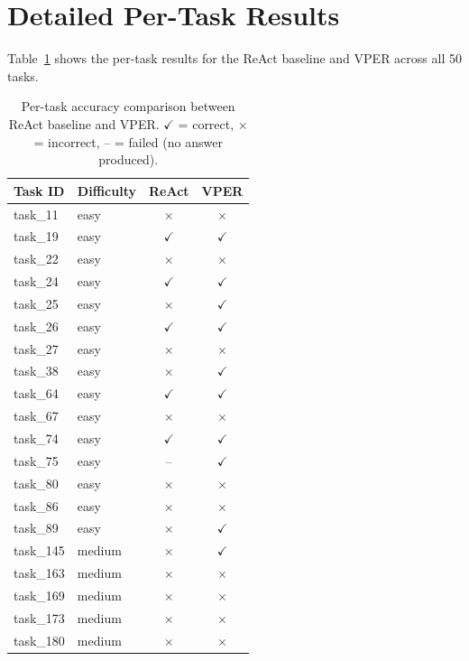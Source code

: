 \appendix

\section{Detailed Per-Task Results}

Table~\ref{tab:per-task} shows the per-task results for the ReAct baseline and VPER across all 50 tasks.

\begin{table}[ht]
\centering
\caption{Per-task accuracy comparison between ReAct baseline and VPER. $\checkmark$ = correct, $\times$ = incorrect, -- = failed (no answer produced).}
\label{tab:per-task}
\scriptsize
\begin{tabular}{llcc}
\toprule
\textbf{Task ID} & \textbf{Difficulty} & \textbf{ReAct} & \textbf{VPER} \\
\midrule
task\_11  & easy    & $\times$ & $\times$ \\
task\_19  & easy    & $\checkmark$ & $\checkmark$ \\
task\_22  & easy    & $\times$ & $\times$ \\
task\_24  & easy    & $\checkmark$ & $\checkmark$ \\
task\_25  & easy    & $\times$ & $\checkmark$ \\
task\_26  & easy    & $\checkmark$ & $\checkmark$ \\
task\_27  & easy    & $\times$ & $\times$ \\
task\_38  & easy    & $\times$ & $\checkmark$ \\
task\_64  & easy    & $\checkmark$ & $\checkmark$ \\
task\_67  & easy    & $\times$ & $\times$ \\
task\_74  & easy    & $\checkmark$ & $\checkmark$ \\
task\_75  & easy    & -- & $\checkmark$ \\
task\_80  & easy    & $\times$ & $\times$ \\
task\_86  & easy    & $\times$ & $\times$ \\
task\_89  & easy    & $\times$ & $\checkmark$ \\
\midrule
task\_145 & medium  & $\times$ & $\checkmark$ \\
task\_163 & medium  & $\times$ & $\times$ \\
task\_169 & medium  & $\times$ & $\times$ \\
task\_173 & medium  & $\times$ & $\times$ \\
task\_180 & medium  & $\times$ & $\times$ \\

\end{tabular}
\end{table}
